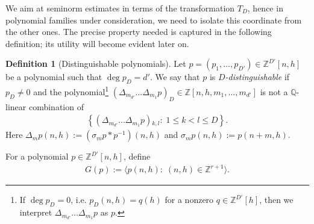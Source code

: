 \documentclass[11pt]{amsart}
\theoremstyle{definition}
\newtheorem{definition}[lemma]{Definition}
\newcommand{\Q}{{\mathbb Q}}
\newcommand{\Z}{{\mathbb Z}}
\newcommand{\1}{{\mathbf{1}}}
\DeclareMathOperator{\Span}{Span}
\newcommand{\rem}[1]{\left \{ #1 \right \}}
\begin{document}
We aim at seminorm estimates in terms of the transformation $T_D$, hence in polynomial families under consideration, we need to isolate this coordinate from the other ones. The precise property needed is captured in the following definition; its utility will become evident later on.
\begin{definition}[Distinguishable polynomials]\label{D: distinguishable}
    Let $p=(p_1, \ldots, p_{D'})\in\Z^{D'}[n,h]$ be a polynomial such that $\deg p_D = d'$. We say that $p$ is \emph{$D$-distinguishable} if 
    $p_D\neq  0$ and the polynomial\footnote{If $\deg p_D = 0$, i.e. $p_D(n,h) = q(h)$ for a nonzero $q\in\Z^{D'}[h]$, then we interpret $\Delta_{m_{d'}}\dots\Delta_{m_{1}}p$ as $p$.} $(\Delta_{m_{d'}}\dots\Delta_{m_{1}}p)_{D}\in\Z[n,h,m_{1},\dots,m_{d'}]$ is not a $\Q$-linear combination of 
    \begin{align*}
        \rem{(\Delta_{m_{d'}}\dots\Delta_{m_{1}}p){_{k,l}\colon\; 1\leq k<l\leq D}}.
    \end{align*}
    Here $\Delta_{m}p(n,h):=(\sigma_{m}p\ast p^{-1})(n,h)$ { and $\sigma_{m}p(n,h):=p(n+m,h)$.}
\end{definition}


For a polynomial $p\in\Z^{D'}[n,h]$, define
\begin{align}\label{E: tilde G}
    {G}(p):=\langle p(n,h)\colon\; (n,h)\in \Z^{r+1}\rangle. %
\end{align}
\end{document}
